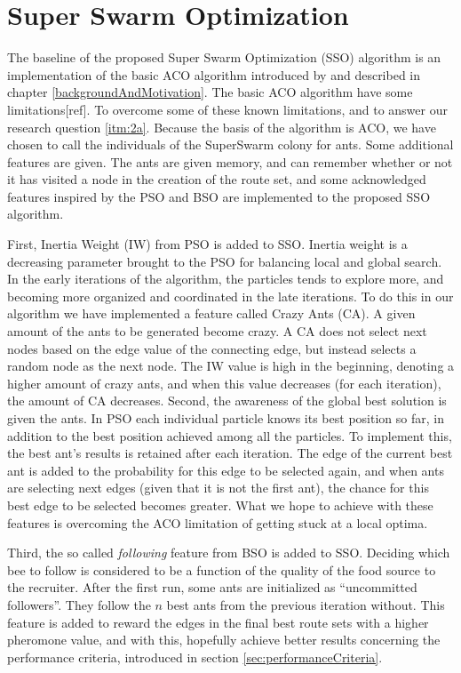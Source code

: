 \section{Super Swarm Optimization}

The baseline of the proposed Super Swarm Optimization (SSO) algorithm is an implementation of the basic ACO algorithm introduced by \citet{nanda11} and described in chapter \vref{backgroundAndMotivation}. The basic ACO algorithm have some limitations[ref]. To overcome some of these known limitations, and to answer our research question \vref{itm:2a}. Because the basis of the algorithm is ACO, we have chosen to call the individuals of the SuperSwarm colony for ants. %
Some additional features are given. The ants are given memory, and can remember whether or not it has visited a node in the creation of the route set, and some acknowledged features inspired by the PSO and BSO are implemented to the proposed SSO algorithm.

First, Inertia Weight (IW) from PSO is added to SSO. Inertia weight is a decreasing parameter brought to the PSO for balancing local and global search. In the early iterations of the algorithm, the particles tends to explore more, and becoming more organized and coordinated in the late iterations.  To do this in our algorithm we have implemented a feature called Crazy Ants (CA). A given amount of the ants to be generated become crazy. A CA does not select next nodes based on the edge value of the connecting edge, but instead selects a random node as the next node. The IW value is high in the beginning, denoting a higher amount of crazy ants, and when this value decreases (for each iteration), the amount of CA decreases. Second, the awareness of the global best solution is given the ants. In PSO each individual particle knows its best position so far, in addition to the best position achieved among all the particles. To implement this, the best ant's results is retained after each iteration. The edge of the current best ant is added to the probability for this edge to be selected again, and when ants are selecting next edges (given that it is not the first ant), the chance for this best edge to be selected becomes greater. What we hope to achieve with these features is overcoming the ACO limitation of getting stuck at a local optima.

Third, the so called \textit{following} feature from BSO is added to SSO. Deciding which bee to follow is considered to be a function of the quality of the food source to the recruiter. After the first run, some ants are initialized as ``uncommitted followers''. They follow the $n$ best ants from the previous iteration without. This feature is added to reward the edges in the final best route sets with a higher pheromone value, and with this, hopefully achieve better results concerning the performance criteria, introduced in section \vref{sec:performanceCriteria}.


